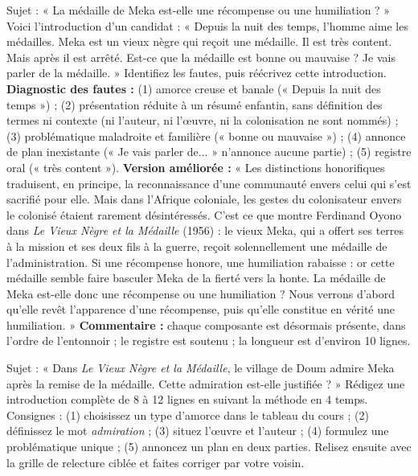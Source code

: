 \documentclass[11pt]{article}
\newcounter{popsec}
\newcounter{popsub}
\newcommand{\courssub}[1]{%
  \stepcounter{popsub}%
  \par\vspace{9pt}\noindent{\popxbold\fontsize{11.5}{13}\selectfont\color{popink}{\color{poporange}\thepopsec.\thepopsub}\hspace{6pt}#1}\par\nopagebreak\vspace{4pt}
}
\begin{document}
\begin{exoresolu}
Sujet : « La médaille de Meka est-elle une récompense ou une humiliation ? » Voici l'introduction d'un candidat : « Depuis la nuit des temps, l'homme aime les médailles. Meka est un vieux nègre qui reçoit une médaille. Il est très content. Mais après il est arrêté. Est-ce que la médaille est bonne ou mauvaise ? Je vais parler de la médaille. » Identifiez les fautes, puis réécrivez cette introduction.
\tcblower
\textbf{Diagnostic des fautes :} (1) amorce creuse et banale (« Depuis la nuit des temps ») ; (2) présentation réduite à un résumé enfantin, sans définition des termes ni contexte (ni l'auteur, ni l'œuvre, ni la colonisation ne sont nommés) ; (3) problématique maladroite et familière (« bonne ou mauvaise ») ; (4) annonce de plan inexistante (« Je vais parler de... » n'annonce aucune partie) ; (5) registre oral (« très content »).
\textbf{Version améliorée :} « Les distinctions honorifiques traduisent, en principe, la reconnaissance d'une communauté envers celui qui s'est sacrifié pour elle. Mais dans l'Afrique coloniale, les gestes du colonisateur envers le colonisé étaient rarement désintéressés. C'est ce que montre Ferdinand Oyono dans \emph{Le Vieux Nègre et la Médaille} (1956) : le vieux Meka, qui a offert ses terres à la mission et ses deux fils à la guerre, reçoit solennellement une médaille de l'administration. Si une récompense honore, une humiliation rabaisse : or cette médaille semble faire basculer Meka de la fierté vers la honte. La médaille de Meka est-elle donc une récompense ou une humiliation ? Nous verrons d'abord qu'elle revêt l'apparence d'une récompense, puis qu'elle constitue en vérité une humiliation. »
\textbf{Commentaire :} chaque composante est désormais présente, dans l'ordre de l'entonnoir ; le registre est soutenu ; la longueur est d'environ 10 lignes.
\end{exoresolu}

\courssub{Production guidée : rédiger votre introduction}

\begin{exercice}
Sujet : « Dans \emph{Le Vieux Nègre et la Médaille}, le village de Doum admire Meka après la remise de la médaille. Cette admiration est-elle justifiée ? » Rédigez une introduction complète de 8 à 12 lignes en suivant la méthode en 4 temps. Consignes : (1) choisissez un type d'amorce dans le tableau du cours ; (2) définissez le mot \emph{admiration} ; (3) situez l'œuvre et l'auteur ; (4) formulez une problématique unique ; (5) annoncez un plan en deux parties. Relisez ensuite avec la grille de relecture ciblée et faites corriger par votre voisin.
\end{exercice}
\end{document}
